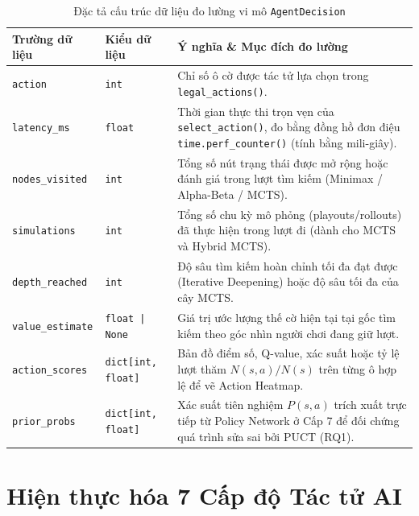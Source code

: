 \documentclass[a4paper,12pt]{report}
\begin{document}
\begin{table}[H]
\centering
\small
\setlength{\tabcolsep}{4pt}
\caption{Đặc tả cấu trúc dữ liệu đo lường vi mô \texttt{AgentDecision}}
\label{tab:agent_decision}
\vspace{0.2cm}
\begin{tabular}{p{3.2cm}p{3.0cm}p{8.8cm}}
\toprule
\textbf{Trường dữ liệu} & \textbf{Kiểu dữ liệu} & \textbf{Ý nghĩa \& Mục đích đo lường} \\
\midrule
\texttt{action} & \texttt{int} & Chỉ số ô cờ được tác tử lựa chọn trong \texttt{legal\_\allowbreak actions()}. \\
\texttt{latency\_\allowbreak ms} & \texttt{float} & Thời gian thực thi trọn vẹn của \texttt{select\_\allowbreak action()}, đo bằng đồng hồ đơn điệu \texttt{time.\allowbreak perf\_\allowbreak counter()} (tính bằng mili-giây). \\
\texttt{nodes\_\allowbreak visited} & \texttt{int} & Tổng số nút trạng thái được mở rộng hoặc đánh giá trong lượt tìm kiếm (Minimax / Alpha-Beta / MCTS). \\
\texttt{simulations} & \texttt{int} & Tổng số chu kỳ mô phỏng (playouts/rollouts) đã thực hiện trong lượt đi (dành cho MCTS và Hybrid MCTS). \\
\texttt{depth\_\allowbreak reached} & \texttt{int} & Độ sâu tìm kiếm hoàn chỉnh tối đa đạt được (Iterative Deepening) hoặc độ sâu tối đa của cây MCTS. \\
\texttt{value\_\allowbreak estimate} & \texttt{float | None} & Giá trị ước lượng thế cờ hiện tại tại gốc tìm kiếm theo góc nhìn người chơi đang giữ lượt. \\
\texttt{action\_\allowbreak scores} & \texttt{dict[int, float]} & Bản đồ điểm số, Q-value, xác suất hoặc tỷ lệ lượt thăm $N(s,a)/N(s)$ trên từng ô hợp lệ để vẽ Action Heatmap. \\
\texttt{prior\_\allowbreak probs} & \texttt{dict[int, float]} & Xác suất tiên nghiệm $P(s, a)$ trích xuất trực tiếp từ Policy Network ở Cấp 7 để đối chứng quá trình sửa sai bởi PUCT (RQ1). \\
\bottomrule
\end{tabular}
\end{table}

\clearpage
\section{Hiện thực hóa 7 Cấp độ Tác tử AI}
\end{document}
